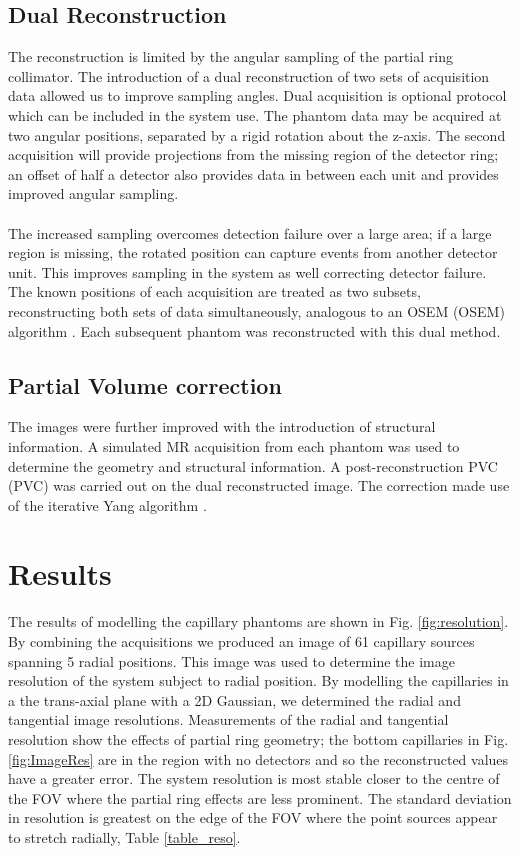 \subsection{Dual Reconstruction}
The reconstruction is limited by the angular sampling of the partial ring collimator. The introduction of a dual reconstruction of two sets of acquisition data allowed us to improve sampling angles. Dual acquisition is optional protocol which can be included in the system use. The phantom data may be acquired at two angular positions, separated by a rigid rotation about the z-axis. The second acquisition will provide projections from the missing region of the detector ring; an offset of half a detector also provides data in between each unit and provides improved angular sampling. 
\paragraph{}
The increased sampling overcomes detection failure over a large area; if a large region is missing, the rotated position can capture events from another detector unit. This improves sampling in the system as well correcting detector failure. The known positions of each acquisition are treated as two subsets, reconstructing both sets of data simultaneously, analogous to an \acrlong{OSEM} (\acrshort{OSEM}) algorithm \cite{Hudson1994AcceleratedData}. Each subsequent phantom was reconstructed with this dual method.

\subsection{Partial Volume correction} 
The images were further improved with the introduction of structural information. A simulated \acrshort{MR} acquisition from each phantom was used to determine the geometry and structural information. A post-reconstruction \acrlong{PVC} (\acrshort{PVC}) was carried out on the dual reconstructed image. The correction made use of the iterative Yang algorithm \cite{Erlandsson2012AOncology.}.

\section{Results}
 The results of modelling the capillary phantoms are shown in Fig. \ref{fig:resolution}. By combining the acquisitions we produced an image of 61 capillary sources spanning 5 radial positions. This image was used to determine the image resolution of the system subject to radial position. By modelling the capillaries in a the trans-axial plane with a 2D Gaussian, we determined the radial and tangential image resolutions. Measurements of the radial and tangential resolution show the effects of partial ring geometry; the bottom capillaries in Fig. \ref{fig:ImageRes} are in the region with no detectors and so the reconstructed values have a greater error. The system resolution is most stable closer to the centre of the \acrshort{FOV} where the partial ring effects are less prominent. The standard deviation in resolution is greatest on the edge of the FOV where the point sources appear to stretch radially, Table \ref{table_reso}.
  

